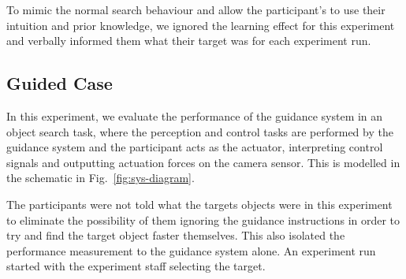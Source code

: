 \documentclass[runningheads]{llncs}
\begin{document}


To mimic the normal search behaviour and allow the participant's to use their intuition and prior knowledge, we ignored the learning effect for this experiment and verbally informed them what their target was for each experiment run.

\subsection{Guided Case}

In this experiment, we evaluate the performance of the guidance system in an object search task, where the perception and control tasks are performed by the guidance system and the participant acts as the actuator, interpreting control signals and outputting actuation forces on the camera sensor. 
This is modelled in the schematic in Fig.~\ref{fig:sys-diagram}. 

The participants were not told what the targets objects were in this experiment to eliminate the possibility of them ignoring the guidance instructions in order to try and find the target object faster themselves.
This also isolated the performance measurement to the guidance system alone.
An experiment run started with the experiment staff selecting the target.


\end{document}
